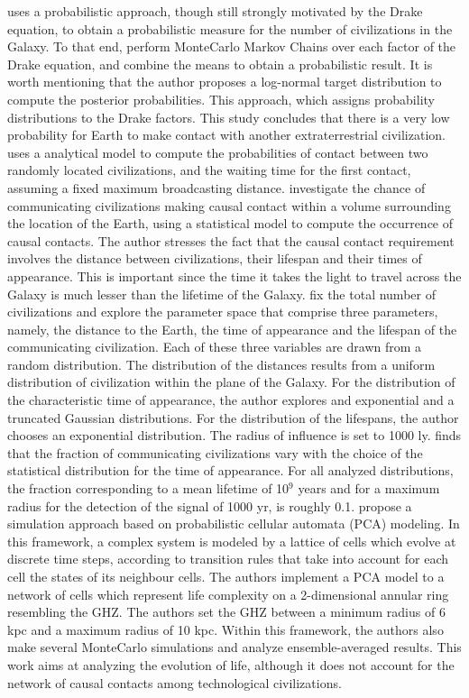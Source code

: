 \citet{bloetscher_using_2019} uses a probabilistic approach, though
still strongly motivated by the Drake equation, to obtain a
probabilistic measure for the number of civilizations in the Galaxy.
%
To that end, perform MonteCarlo Markov Chains over each factor of the
Drake equation, and combine the means to obtain a probabilistic
result.
%
It is worth mentioning that the author proposes a log-normal target
distribution to compute the posterior probabilities.
%
This approach, which assigns probability distributions to the Drake
factors.
%
This study concludes that there is a very low probability for Earth to
make contact with another extraterrestrial civilization.    
%
\citet{smith_broadcasting_2009} uses a analytical model to compute the
probabilities of contact between two randomly located civilizations,
and the waiting time for the first contact, assuming a fixed maximum
broadcasting distance.
% 
\citet{balbi_impact_2018} investigate the chance of communicating
civilizations making causal contact within a volume surrounding the
location of the Earth, using a statistical model to compute the
occurrence of causal contacts. The author stresses the fact that the
causal contact requirement involves the distance between
civilizations, their lifespan and their times of appearance.  This is
important since the time it takes the light to travel across the
Galaxy is much lesser than the lifetime of the Galaxy.
%
\citet{balbi_impact_2018} fix the total number of civilizations and
explore the parameter space that comprise three parameters, namely,
the distance to the Earth, the time of appearance and the lifespan of
the communicating civilization. Each of these three variables are
drawn from a random distribution. The distribution of the distances
results from a uniform distribution of civilization within the plane
of the Galaxy. For the distribution of the characteristic time of
appearance, the author explores and exponential and a truncated
Gaussian distributions. For the distribution of the lifespans, the
author chooses an exponential distribution. The radius of influence is
set to 1000 ly.
%
\citet{balbi_impact_2018} finds that the fraction of communicating
civilizations vary with the choice of the statistical distribution for
the time of appearance. For all analyzed distributions, the fraction
corresponding to a mean lifetime of 10$^9$ years and for a maximum
radius for the detection of the signal of 1000 yr, is roughly 0.1.
%
\citet{vukotic_astrobiological_2012} propose a simulation approach
based on probabilistic cellular automata (PCA) modeling. In this
framework, a complex system is modeled by a lattice of cells which
evolve at discrete time steps, according to transition rules that take
into account for each cell the states of its neighbour cells.
%
The authors implement a PCA model to a network of cells which
represent life complexity on a 2-dimensional annular ring resembling
the GHZ. The authors set the GHZ between a minimum radius of 6 kpc and
a maximum radius of 10 kpc. Within this framework, the authors also
make several MonteCarlo simulations and analyze ensemble-averaged
results.
%
This work aims at analyzing the evolution of life, although it does
not account for the network of causal contacts among technological
civilizations.

